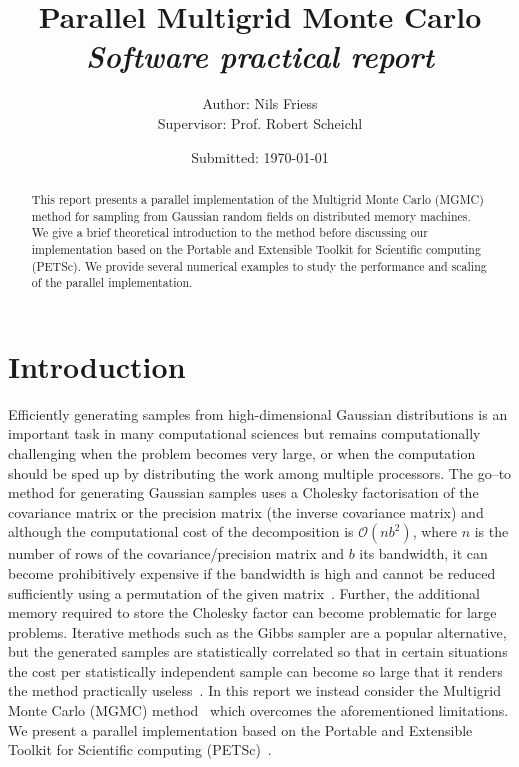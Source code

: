 \documentclass[
fontsize=11pt,
paper=a4,
numbers=noenddot
]{scrartcl}
\title{\vspace{-1cm}Parallel Multigrid Monte Carlo\\
{\normalsize\normalfont\emph{Software practical report}}}
\date{\normalsize Submitted: \today}
\author{\normalsize Author: Nils Friess\\
\normalsize Supervisor: Prof. Robert Scheichl}
\begin{document}
\maketitle

\begin{abstract}
    This report presents a parallel implementation of the Multigrid Monte Carlo (MGMC) method for sampling from Gaussian random fields on distributed memory machines. We give a brief theoretical introduction to the method before discussing our implementation based on the Portable and Extensible Toolkit for Scientific computing (PETSc). We provide several numerical examples to study the performance and scaling of the parallel implementation.
\end{abstract}

\section{Introduction}
Efficiently generating samples from high-dimensional Gaussian distributions is an important task in many computational sciences but remains computationally challenging when the problem becomes very large, or when the computation should be sped up by distributing the work among multiple processors. The go--to method for generating Gaussian samples uses a Cholesky factorisation of the covariance matrix or the precision matrix (the inverse covariance matrix) and although the computational cost of the decomposition is $\mathcal{O}(nb^2)$, where $n$ is the number of rows of the covariance/precision matrix and $b$ its bandwidth, it can become prohibitively expensive if the bandwidth is high and cannot be reduced sufficiently using a permutation of the given matrix~\cite{golubvanloan,rue2001fast,foxparker}. Further, the additional memory required to store the Cholesky factor can become problematic for large problems. Iterative methods such as the Gibbs sampler are a popular alternative, but the generated samples are statistically correlated so that in certain situations the cost per statistically independent sample can become so large that it renders the method practically useless~\cite{foxparker,kazashimuellerscheichl}. In this report we instead consider the Multigrid Monte Carlo (MGMC) method~\cite{goodmansokal} which overcomes the aforementioned limitations. We present a parallel implementation based on the Portable and Extensible Toolkit for Scientific computing (PETSc)~\cite{petsc-web-page,petsc-user-ref}.
\end{document}
